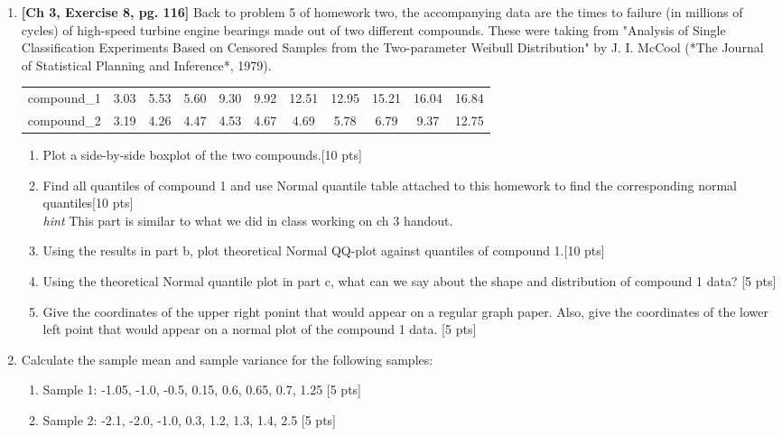 \documentclass[11pt]{article}\usepackage[]{graphicx}\usepackage[]{color}
\begin{document}
\begin{enumerate}
\item \textbf{[Ch 3, Exercise 8, pg. 116]} Back to problem 5 of homework two,  the accompanying data are the times to failure (in millions of cycles) of high-speed turbine engine bearings made out of two different compounds. These were taking from "Analysis of Single Classification Experiments Based on Censored Samples from the Two-parameter Weibull Distribution" by J. I. McCool (*The Journal of Statistical Planning and Inference*, 1979).
    

\begin{center}
	\begin{tabular}{|ccccccccccc|}	
		\hline
		compound_1  & 3.03 & 5.53 & 5.60 & 9.30 & 9.92 & 12.51 & 12.95 & 15.21 & 16.04 & 16.84\\
		compound_2 & 3.19 & 4.26 & 4.47 & 4.53 & 4.67 & 4.69 & 5.78 & 6.79 & 9.37 & 12.75\\
		\hline
	\hline                 
	\end{tabular}
\end{center}

\begin{enumerate}
    \item Plot a side-by-side boxplot of the two compounds.[10 pts]
    
    \item Find all quantiles of compound 1 and use Normal quantile table attached to this homework to find the corresponding normal quantiles[10 pts]\\
    \emph{hint} This part is similar to what we did in class working on ch 3 handout. 
    \item Using the results in part b, plot theoretical Normal QQ-plot against quantiles of compound 1.[10 pts]
    \item Using the theoretical Normal quantile plot in part c, what can we say about the shape and distribution of compound 1 data? [5 pts]
    \item Give the coordinates  of the upper right ponint that would appear on a regular graph paper. Also, give the coordinates of the lower left point that would appear on a normal plot of the compound 1 data. [5 pts]
\end{enumerate}    


\item Calculate the sample mean and sample variance for the following samples:
\begin{enumerate}
	\item Sample 1: -1.05, -1.0, -0.5, 0.15, 0.6, 0.65, 0.7, 1.25 [5 pts]
	\item Sample 2: -2.1, -2.0, -1.0, 0.3, 1.2, 1.3, 1.4, 2.5 [5 pts]
\end{enumerate}




\end{enumerate}
\end{document}
